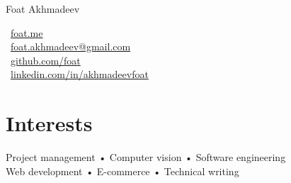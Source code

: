 \documentclass[10pt, a4paper]{article}
\makeatletter
\def\myauthor{Foat Akhmadeev}
\def\myemail{foat.akhmadeev@gmail.com}
\def\mygithub{github.com/foat}
\def\mylinkedin{linkedin.com/in/akhmadeevfoat}
\def\myhomesite{foat.me}
\makeatother
\begin{document}
{\LARGE \myauthor}\\[1cm]
\begin{minipage}[t]{2in}
\end{minipage}
\begin{minipage}[t]{4in}
\flushleft
\faHome \, \href{http://\myhomesite}{\myhomesite}\\
\faEnvelopeAlt \, \href{mailto:\myemail}{\myemail}\\
\faGithub \, \href{https://\mygithub}{\mygithub}\\
\faLinkedin \, \href{https://\mylinkedin}{\mylinkedin}\\
\end{minipage}

\section*{Interests}
Project management • Computer vision • Software engineering\\
Web development • E-commerce • Technical writing
\end{document}
